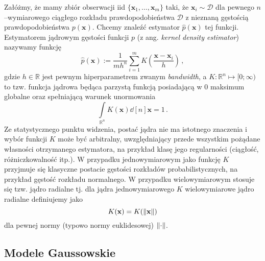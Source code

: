 \documentclass{myclass}
\begin{document}
Załóżmy, że mamy zbiór obserwacji iid \(\{\mathbf{x}_1, \ldots, \mathbf{x}_m\}\) taki, że
\(\mathbf{x}_i \sim \mathcal{D}\) dla pewnego \(n\)--wymiarowego ciągłego rozkładu
prawdopodobieństwa \(\mathcal{D}\) z nieznaną gęstością prawdopodobieństwa \(p(\mathbf{x})\). Chcemy
znaleźć estymator \(\hat{p}(\mathbf{x})\) tej funkcji. Estymatorem jądrowym gęstości funkcji \(p\)
(z ang. \textit{kernel density estimator}) nazywamy funkcję
\begin{equation*}
    \hat{p}(\mathbf{x}) := \frac{1}{mh^n}\sum_{i=1}^m K\left(\frac{\mathbf{x} - \mathbf{x}_i}{h}\right)\,,
\end{equation*}
gdzie \(h \in \mathbb{R}\) jest pewnym hiperparametrem zwanym \textit{bandwidth}, a \(K:
\mathbb{R}^n \mapsto [0; \infty)\) to tzw. funkcja jądrowa będąca parzystą funkcją posiadającą w 0
maksimum globalne oraz spełniającą warunek unormowania
\begin{equation*}
    \int\limits_{\mathbb{R}^n} K(\mathbf{x}) \dd[n]{\mathbf{x}}= 1\,.
\end{equation*}
Ze statystycznego punktu widzenia, postać jądra nie ma istotnego znaczenia i wybór funkcji  \(K\)
może być arbitralny, uwzględniający przede wszystkim pożądane własności otrzymanego estymatora, na
przykład klasę jego regularności (ciągłość, różniczkowalność itp.). W przypadku jednowymiarowym jako
funkcję \(K\) przyjmuje się klasyczne postacie gęstości rozkładów probabilistycznych, na przykład
gęstość rozkładu normalnego. W przypadku wielowymiarowym stosuje się tzw. jądro radialne tj. dla
jądra jednowymiarowego \(K\) wielowymiarowe jądro radialne definiujemy jako
\begin{equation*}
    K(\mathbf{x}) = K(\norm{\mathbf{x}})
\end{equation*}
dla pewnej normy (typowo normy euklidesowej) \(\norm{\cdot}\).

\subsection{Modele Gaussowskie}
\end{document}
